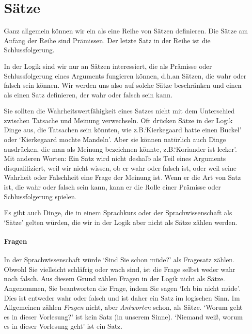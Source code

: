 

\section{Sätze}
\label{intro.sentences}

Ganz allgemein können wir ein  als eine Reihe von Sätzen definieren. Die Sätze am Anfang der Reihe sind Prämissen. Der letzte Satz in der Reihe ist die Schlussfolgerung.

In der Logik sind wir nur an Sätzen interessiert, die als Prämisse oder Schlussfolgerung eines Arguments fungieren können, d.h.\@ an Sätzen, die wahr oder falsch sein können.  Wir werden uns also auf solche Sätze beschränken und einen  als einen Satz definieren, der wahr oder falsch sein kann.

Sie sollten die Wahrheitswertfähigkeit eines Satzes nicht mit dem Unterschied zwischen Tatsache und Meinung verwechseln. Oft drücken Sätze in der Logik Dinge aus, die Tatsachen sein könnten, wie z.B.\@ `Kierkegaard hatte einen Buckel' oder `Kierkegaard mochte Mandeln'. Aber sie können natürlich auch Dinge ausdrücken, die man als Meinung bezeichnen könnte, z.B.\@ `Koriander ist lecker'. Mit anderen Worten: Ein Satz wird nicht deshalb als Teil eines Arguments disqualifiziert, weil wir nicht wissen, ob er wahr oder falsch ist, oder weil seine Wahrheit oder Falschheit eine Frage der Meinung ist. Wenn er die Art von Satz ist, die wahr oder falsch sein kann, kann er die Rolle einer Prämisse oder Schlussfolgerung spielen.

Es gibt auch Dinge, die in einem Sprachkurs oder der Sprachwissenschaft als `Sätze' gelten würden, die wir in der Logik aber nicht als Sätze zählen werden.

\paragraph{Fragen} In der Sprachwissenschaft würde `Sind Sie schon müde?' als Fragesatz zählen. Obwohl Sie vielleicht schläfrig oder wach sind, ist die Frage selbst weder wahr noch falsch. Aus diesem Grund zählen Fragen in der Logik nicht als Sätze. Angenommen, Sie beantworten die Frage, indem Sie sagen `Ich bin nicht müde'. Dies ist entweder wahr oder falsch und ist daher ein Satz im logischen Sinn. Im Allgemeinen zählen \emph{Fragen} nicht, aber \emph{Antworten} schon, als Sätze. `Worum geht es in dieser Vorlesung?' ist kein Satz (in unserem Sinne). `Niemand wei{\ss}, worum es in dieser Vorlesung geht' ist ein Satz.

